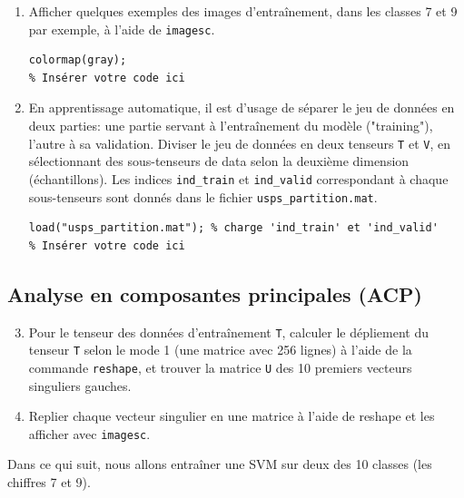 \begin{enumerate}
	\item Afficher quelques exemples des images d'entraînement, dans les classes 7 et 9 par exemple, à l'aide de \texttt{imagesc}.
\begin{lstlisting}
colormap(gray);
% Insérer votre code ici
\end{lstlisting}

	\item En apprentissage automatique, il est d'usage de séparer le jeu de données en deux parties: une partie servant à l'entraînement du modèle ("training"), l'autre à sa validation. Diviser le jeu de données en deux tenseurs \texttt{T} et \texttt{V}, en sélectionnant des sous-tenseurs de data selon la deuxième dimension (échantillons). Les indices \texttt{ind\_train} et \texttt{ind\_valid} correspondant à chaque sous-tenseurs sont donnés dans le fichier \texttt{usps\_partition.mat}.
\begin{lstlisting}
load("usps_partition.mat"); % charge 'ind_train' et 'ind_valid'
% Insérer votre code ici
\end{lstlisting}
\end{enumerate}

\subsection{Analyse en composantes principales (ACP)}

\begin{enumerate}
\setcounter{enumi}{2}
\item Pour le tenseur des données d'entraînement \texttt{T}, calculer le dépliement du tenseur \texttt{T} selon le mode 1 (une matrice avec 256 lignes) à l'aide de la commande \texttt{reshape}, et trouver la matrice \texttt{U} des 10 premiers vecteurs singuliers gauches.

\item Replier chaque vecteur singulier en une matrice  à l'aide de reshape et les afficher avec \texttt{imagesc}.
\end{enumerate}

Dans ce qui suit, nous allons entraîner une SVM sur deux des 10 classes (les chiffres 7 et 9).

